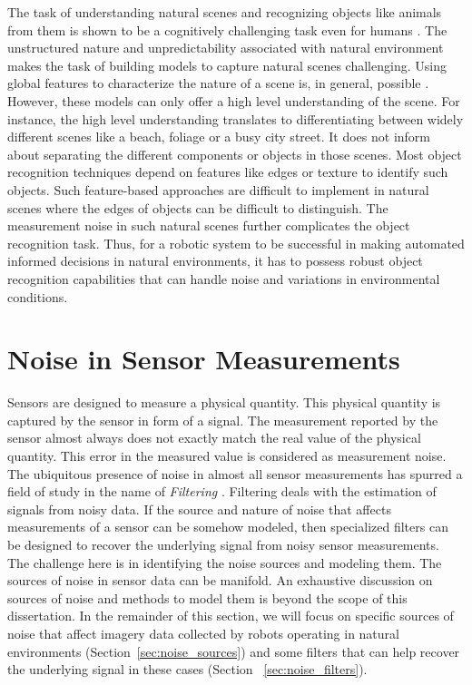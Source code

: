 The task of understanding natural scenes and recognizing objects like animals from them is shown to be a cognitively challenging task 
even for humans \cite{wichmann}. The unstructured nature and unpredictability associated with natural environment makes the task of 
building models to capture natural scenes challenging.
Using global features to characterize the nature of a scene is, in general, possible \cite{olivia}. However, these models can only offer a high level understanding
of the scene. For instance, the high level understanding translates to differentiating between widely different scenes like a beach, foliage or a busy city street. It does not inform about separating the different components or objects in those scenes. Most object recognition techniques depend on features like edges or texture to identify such objects. Such feature-based approaches are difficult to implement in natural scenes where the edges of objects can be difficult to distinguish.
The measurement noise in such natural scenes further complicates the object recognition task. 
Thus, for a robotic system to be
successful in making automated informed decisions in natural environments, it has to possess robust object recognition capabilities that can handle noise and variations in environmental conditions.


\section{Noise in Sensor Measurements}

Sensors are designed to measure a physical quantity. This physical quantity is captured by the sensor in form of a signal.
The measurement reported by the sensor almost always does not exactly match the real value of the physical quantity.
This error in the measured value is considered as measurement noise.
The ubiquitous presence of noise in almost all sensor measurements has spurred a field of study in the name of 
\emph{Filtering} \cite{haykin}. Filtering deals with the estimation of signals from noisy data. 
If the source and nature of noise that affects measurements of a sensor can be somehow modeled, then specialized
filters can be designed to recover the underlying signal from noisy sensor measurements.
The challenge here is in identifying the noise sources and modeling them. 
The sources of noise in sensor data can be manifold. An exhaustive discussion on sources of noise and methods to model them
is beyond the scope of this dissertation. In the remainder of this section, we will focus on specific sources of noise that affect 
imagery data collected by robots operating in natural environments (Section~\ref{sec:noise_sources}) and some filters that can 
help recover the underlying signal in these cases (Section ~\ref{sec:noise_filters}).

